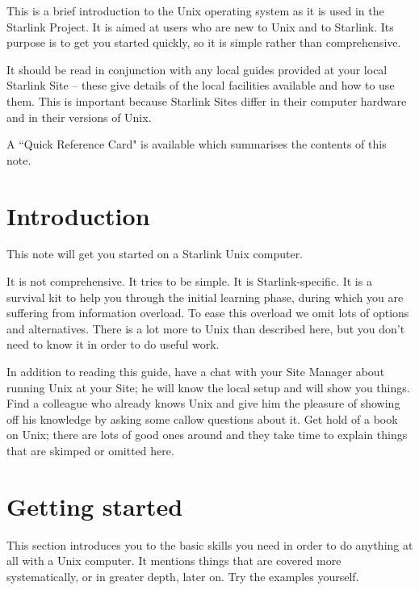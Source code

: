 \documentclass[twoside,11pt]{article}
\newcommand{\stardocinitials}  {SUN}
\newcommand{\stardocnumber}    {145.6}
\newcommand{\stardocabstract}  {
This is a brief introduction to the Unix operating system as it is
used in the Starlink Project. It is aimed at users who are new to Unix
and to Starlink. Its purpose is to get you started quickly, so it is
simple rather than comprehensive.

It should be read in conjunction with any local guides provided at
your local Starlink Site -- these give details of the local facilities
available and how to use them. This is important because Starlink
Sites differ in their computer hardware and in their versions of Unix.

A ``Quick Reference Card" is available which summarises the contents of this
note.
}
\newcommand{\stardocname}{\stardocinitials /\stardocnumber}
\newenvironment{latexonly}{}{}
\renewcommand{\thepage}{\roman{page}}
\begin{document}
\stardocabstract
\newpage
\begin{latexonly}
   \setlength{\parskip}{0mm}
   \tableofcontents
   \setlength{\parskip}{\medskipamount}
   \markright{\stardocname}
\end{latexonly}
\newpage
\renewcommand{\thepage}{\arabic{page}}
\setcounter{page}{1}

\newpage

\section{Introduction}

This note will get you started on a Starlink Unix computer.

It is not comprehensive.
It tries to be simple.
It is Starlink-specific.
It is a survival kit to help you through the initial learning phase, during
which you are suffering from information overload.
To ease this overload we omit lots of options and alternatives.
There is a lot more to Unix than described here, but you don't need to
know it in order to do useful work.

In addition to reading this guide, have a chat with your Site Manager about
running Unix at your Site; he will know the local setup and will show
you things.
Find a colleague who already knows Unix and give him the pleasure of showing
off his knowledge by asking some callow questions about it.
Get hold of a book on Unix; there are lots of good ones around and
they take time to explain things that are skimped or omitted here.

\newpage

\section{Getting started}

This section introduces you to the basic skills you need in order to do anything
at all with a Unix computer.
It mentions things that are covered more systematically, or in greater depth,
later on.
Try the examples yourself.
\end{document}
